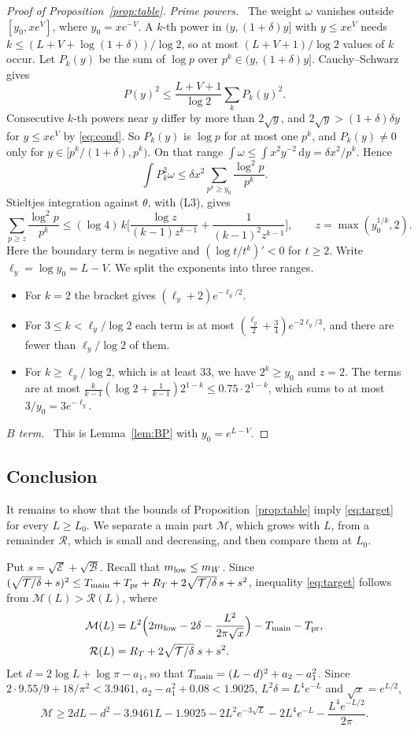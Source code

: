 \documentclass[11pt]{amsart}
\theoremstyle{remark}
\newcommand{\dd}{\,\mathrm{d}}
\newcommand{\step}[1]{\smallskip\noindent\textit{#1.}\ }
\begin{document}
\begin{proof}[Proof of Proposition~\ref{prop:table}]
\step{Prime powers} The weight $\omega$ vanishes outside $[y_0,xe^V]$, where $y_0=xe^{-V}$. A $k$-th power in $(y,(1+\delta)y]$ with $y\le xe^V$ needs $k\le(L+V+\log(1+\delta))/\log2$, so at most $(L+V+1)/\log2$ values of $k$ occur. Let $P_k(y)$ be the sum of $\log p$ over $p^k\in(y,(1+\delta)y]$. Cauchy--Schwarz gives
\[
P(y)^2\le\frac{L+V+1}{\log2}\sum_kP_k(y)^2.
\]
Consecutive $k$-th powers near $y$ differ by more than $2\sqrt y$, and $2\sqrt y>(1+\delta)\delta y$ for $y\le xe^V$ by \eqref{eq:cond}. So $P_k(y)$ is $\log p$ for at most one $p^k$, and $P_k(y)\ne0$ only for $y\in[p^k/(1+\delta),p^k)$. On that range $\int\omega\le\int x^2y^{-2}\dd y=\delta x^2/p^k$. Hence
\[
\int P_k^2\omega\le\delta x^2\sum_{p^k\ge y_0}\frac{\log^2p}{p^k}.
\]
Stieltjes integration against $\theta$, with (L3), gives
\[
\sum_{p\ge z}\frac{\log^2p}{p^k}\le(\log4)\,k\Big[\frac{\log z}{(k-1)z^{k-1}}+\frac1{(k-1)^2z^{k-1}}\Big],\qquad z=\max(y_0^{1/k},2).
\]
Here the boundary term is negative and $(\log t/t^k)'<0$ for $t\ge2$. Write $\ell_y=\log y_0=L-V$. We split the exponents into three ranges.
\begin{itemize}
\item[--] For $k=2$ the bracket gives $(\ell_y+2)e^{-\ell_y/2}$.
\item[--] For $3\le k<\ell_y/\log2$ each term is at most $(\frac{\ell_y}2+\frac34)e^{-2\ell_y/3}$, and there are fewer than $\ell_y/\log2$ of them.
\item[--] For $k\ge\ell_y/\log2$, which is at least $33$, we have $2^k\ge y_0$ and $z=2$. The terms are at most $\frac{k}{k-1}(\log2+\frac1{k-1})2^{1-k}\le0.75\cdot2^{1-k}$, which sums to at most $3/y_0=3e^{-\ell_y}$.
\end{itemize}

\step{$B$ term} This is Lemma~\ref{lem:BP} with $y_0=e^{L-V}$.
\end{proof}

\subsection{Conclusion}
It remains to show that the bounds of Proposition~\ref{prop:table} imply \eqref{eq:target} for every $L\ge L_0$. We separate a main part $\mathcal M$, which grows with $L$, from a remainder $\mathcal R$, which is small and decreasing, and then compare them at $L_0$.

Put $s=\sqrt{\mathcal E}+\sqrt{\mathcal B}$. Recall that $m_{\rm low}\le m_W$. Since $(\sqrt{\mathcal T/\delta}+s)^2\le T_{\rm main}+T_{\rm pr}+R_T+2\sqrt{\mathcal T/\delta}\,s+s^2$, inequality \eqref{eq:target} follows from $\mathcal M(L)>\mathcal R(L)$, where
\begin{align*}
\mathcal M(L)&=L^2\Big(2m_{\rm low}-2\delta-\frac{L^2}{2\pi\sqrt x}\Big)-T_{\rm main}-T_{\rm pr},\\
\mathcal R(L)&=R_T+2\sqrt{\mathcal T/\delta}\;s+s^2 .
\end{align*}
Let $d=2\log L+\log\pi-a_1$, so that $T_{\rm main}=(L-d)^2+a_2-a_1^2$. Since $2\cdot9.55/9+18/\pi^2<3.9461$, $a_2-a_1^2+0.08<1.9025$, $L^2\delta=L^4e^{-L}$ and $\sqrt x=e^{L/2}$,
\[
\mathcal M\ge2dL-d^2-3.9461L-1.9025-2L^2e^{-3\sqrt L}-2L^4e^{-L}-\frac{L^4e^{-L/2}}{2\pi}.
\]
\end{document}
